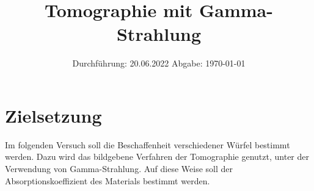 

\subject{V14}
\title{Tomographie mit Gamma-Strahlung}
\date{
    Durchführung: 20.06.2022
     \hspace{3em}
    Abgabe: \today %
}


\maketitle
\thispagestyle{empty}
\tableofcontents
\newpage

\section{Zielsetzung}

    Im folgenden Versuch soll die Beschaffenheit verschiedener Würfel bestimmt werden.
    Dazu wird das bildgebene Verfahren der Tomographie genutzt,
    unter der Verwendung von Gamma-Strahlung.
    Auf diese Weise soll der Absorptionskoeffizient des Materials bestimmt werden.


\clearpage


\clearpage


\clearpage


\clearpage

\printbibliography


